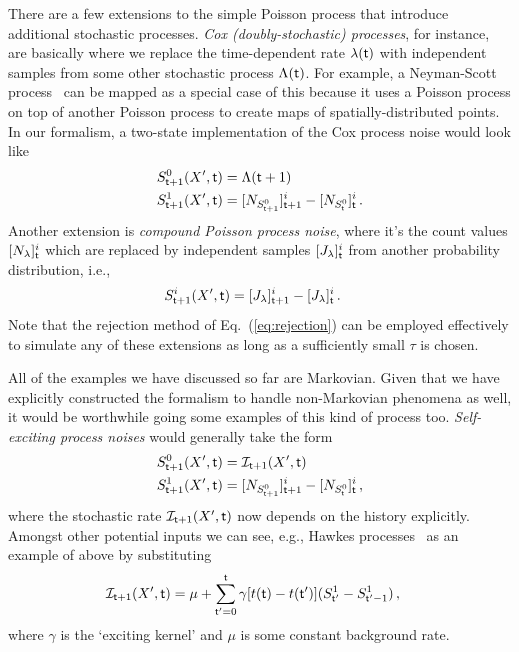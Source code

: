 \documentclass{book}
\begin{document}
There are a few extensions to the simple Poisson process that introduce additional stochastic processes. \emph{Cox (doubly-stochastic) processes}, for instance, are basically where we replace the time-dependent rate $\lambda ({\sf t})$ with independent samples from some other stochastic process $\Lambda ({\sf t})$. For example, a Neyman-Scott process~\cite{neyman1958statistical} can be mapped as a special case of this because it uses a Poisson process on top of another Poisson process to create maps of spatially-distributed points. In our formalism, a two-state implementation of the Cox process noise would look like
\begin{align}
S^{0}_{{\sf t}+1}(X',{\sf t}) &= \Lambda ({\sf t}+1) \\
S^{1}_{{\sf t}+1}(X',{\sf t}) &= [N_{S^{0}_{{\sf t}+1}}]^i_{{\sf t}+1}-[N_{S^{0}_{{\sf t}}}]^i_{\sf t}\,.
\end{align}
Another extension is \emph{compound Poisson process noise}, where it's the count values $[N_{\lambda}]^i_{\sf t}$ which are replaced by independent samples $[J_{\lambda}]^i_{\sf t}$ from another probability distribution, i.e.,
\begin{align}
S^{i}_{{\sf t}+1}(X',{\sf t}) &= [J_{\lambda}]^i_{{\sf t}+1}-[J_{\lambda}]^i_{\sf t}\,.
\end{align}
Note that the rejection method of Eq.~(\ref{eq:rejection}) can be employed effectively to simulate any of these extensions as long as a sufficiently small $\tau$ is chosen.

All of the examples we have discussed so far are Markovian. Given that we have explicitly constructed the formalism to handle non-Markovian phenomena as well, it would be worthwhile going some examples of this kind of process too. \emph{Self-exciting process noises} would generally take the form
\begin{align}
S^{0}_{{\sf t}+1}(X',{\sf t}) &= {\cal I}_{{\sf t}+1} (X',{\sf t}) \\
S^{1}_{{\sf t}+1}(X',{\sf t}) &= [N_{S^{0}_{{\sf t}+1}}]^i_{{\sf t}+1}-[N_{S^{0}_{{\sf t}}}]^i_{\sf t} \,,
\end{align}
where the stochastic rate ${\cal I}_{{\sf t}+1} (X',{\sf t})$ now depends on the history explicitly. Amongst other potential inputs we can see, e.g., Hawkes processes~\cite{hawkes1971spectra} as an example of above by substituting 
\begin{align}
{\cal I}_{{\sf t}+1} (X',{\sf t}) &= \mu + \sum^{{\sf t}}_{{\sf t}'=0}\gamma [t({\sf t})-t({\sf t}')](S^{1}_{{\sf t}'}-S^{1}_{{\sf t}'-1}) \,,
\end{align}
where $\gamma$ is the `exciting kernel' and $\mu$ is some constant background rate. 
\end{document}
